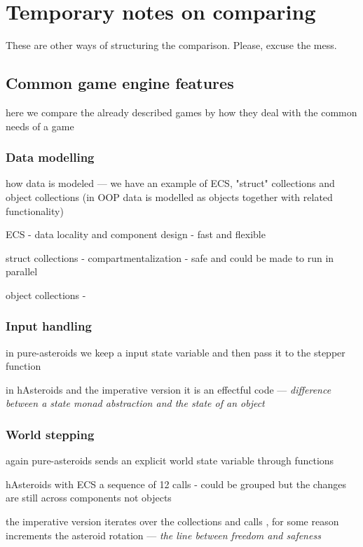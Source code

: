 \documentclass[
  digital, %
  color,   %
  table,   %
  oneside, %
  lof,     %
  lot,     %
]{fithesis3}
\begin{document}
{%
\chapter*{Temporary notes on comparing}

These are other ways of structuring the comparison. Please, excuse the mess.

\section{Common game engine features}
here we compare the already described games by how they
deal with the common needs of a game

\subsection{Data modelling}
how data is modeled --- we have an example of ECS, "struct" collections
and object collections (in OOP data is modelled as objects together with related functionality)

ECS - data locality and component design - fast and flexible

struct collections - compartmentalization - safe and could be made to run in parallel

object collections - 

\subsection{Input handling}

in pure-asteroids we keep a input state variable and then pass it to the stepper function

in hAsteroids and the imperative version it is an effectful code
--- \emph{difference between a state monad abstraction and the state of an object}

\subsection{World stepping}

again pure-asteroids sends an explicit world state variable through functions

hAsteroids with ECS a sequence of 12 calls - could be grouped but the
changes are still across components not objects

the imperative version iterates over the collections and calls ,
for some reason  increments the asteroid rotation
--- \emph{the line between freedom and safeness}

}
\end{document}
